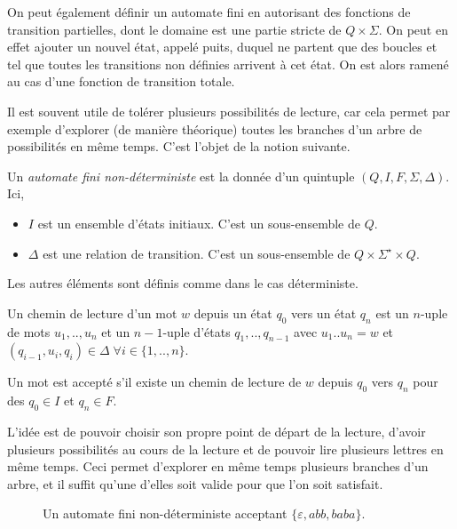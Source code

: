 \begin{rem}
On peut également définir un automate fini en autorisant des fonctions de transition partielles, dont le domaine est une partie stricte de $Q\times\Sigma$. On peut en effet ajouter un nouvel état, appelé puits, duquel ne partent que des boucles et tel que toutes les transitions non définies arrivent à cet état. On est alors ramené au cas d'une fonction de transition totale.
\end{rem}

Il est souvent utile de tolérer plusieurs possibilités de lecture, car cela permet par exemple d'explorer (de manière théorique) toutes les branches d'un arbre de possibilités en même temps. C'est l'objet de la notion suivante.

\begin{dfn}
Un \emph{automate fini non-déterministe} est la donnée d'un quintuple $(Q,I,F,\Sigma,\Delta)$. Ici, 
\begin{itemize}
\item $I$ est un ensemble d'états initiaux. C'est un sous-ensemble de $Q$.
\item $\Delta$ est une relation de transition. C'est un sous-ensemble de $Q\times \Sigma^\star\times Q$.
\end{itemize}
Les autres éléments sont définis comme dans le cas déterministe.

Un chemin de lecture d'un mot $w$ depuis un état $q_0$ vers un état $q_n$ est un $n$-uple de mots $u_1,..,u_n$ et un $n-1$-uple d'états $q_1,..,q_{n-1}$ avec $u_1..u_n=w$ et $(q_{i-1},u_i,q_i)\in\Delta\;\forall i\in \{1,..,n\}$.

Un mot est accepté s'il existe un chemin de lecture de $w$ depuis $q_0$ vers $q_n$ pour des $q_0\in I$ et $q_n\in F$.
\end{dfn}

L'idée est de pouvoir choisir son propre point de départ de la lecture, d'avoir plusieurs possibilités au cours de la lecture et de pouvoir lire plusieurs lettres en même temps. Ceci permet d'explorer en même temps plusieurs branches d'un arbre, et il suffit qu'une d'elles soit valide pour que l'on soit satisfait.

\begin{figure}
\centering
{}
\caption{Un automate fini non-déterministe acceptant $\{\varepsilon,abb,baba\}$.}
\label{sk:fig:nfa1}
\end{figure}

